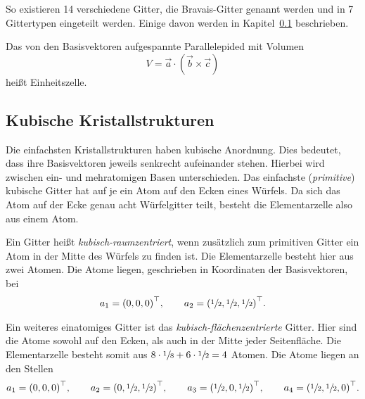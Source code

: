 So existieren 14 verschiedene Gitter, die Bravais-Gitter genannt werden
und in 7 Gittertypen eingeteilt werden.
Einige davon werden in Kapitel~\ref{sub:kubische_kristallstrukturen} beschrieben.

Das von den Basisvektoren aufgespannte Parallelepided mit Volumen
\begin{equation}
  V = \vec{a} \cdot \left(\vec{b} \times \vec{c}\right)
\end{equation}
heißt Einheitszelle.


\subsection{Kubische Kristallstrukturen}%
\label{sub:kubische_kristallstrukturen}
Die einfachsten Kristallstrukturen haben kubische Anordnung.
Dies bedeutet, dass ihre Basisvektoren jeweils senkrecht aufeinander stehen.
Hierbei wird zwischen ein- und mehratomigen Basen unterschieden.
Das einfachste (\textit{primitive}) kubische Gitter hat auf je ein Atom auf den Ecken eines Würfels.
Da sich das Atom auf der Ecke genau acht Würfelgitter teilt,
besteht die Elementarzelle also aus einem Atom.

Ein Gitter heißt \textit{kubisch-raumzentriert}, wenn zusätzlich zum primitiven Gitter
ein Atom in der Mitte des Würfels zu finden ist.
Die Elementarzelle besteht hier aus zwei Atomen.
Die Atome liegen, geschrieben in Koordinaten der Basisvektoren, bei
\begin{align*}
  a_1 = {\left(0, 0, 0\right)}^\top, \hspace{2em} a_2 = {\left(\sfrac{1}{2}, \sfrac{1}{2}, \sfrac{1}{2}\right)}^\top.
\end{align*}

Ein weiteres einatomiges Gitter ist das \textit{kubisch-flächenzentrierte} Gitter.
Hier sind die Atome sowohl auf den Ecken, als auch in der Mitte jeder Seitenfläche.
Die Elementarzelle besteht somit aus $8 \cdot \sfrac{1}{8} + 6 \cdot \sfrac{1}{2} = 4$ Atomen.
Die Atome liegen an den Stellen
\begin{align*}
  a_1 = {\left(0, 0, 0\right)}^\top, \hspace{2em}
  a_2 = {\left(0, \sfrac{1}{2}, \sfrac{1}{2}\right)}^\top, \hspace{2em}
  a_3 = {\left(\sfrac{1}{2}, 0, \sfrac{1}{2}\right)}^\top, \hspace{2em}
  a_4 = {\left(\sfrac{1}{2}, \sfrac{1}{2}, 0\right)}^\top.
\end{align*}

